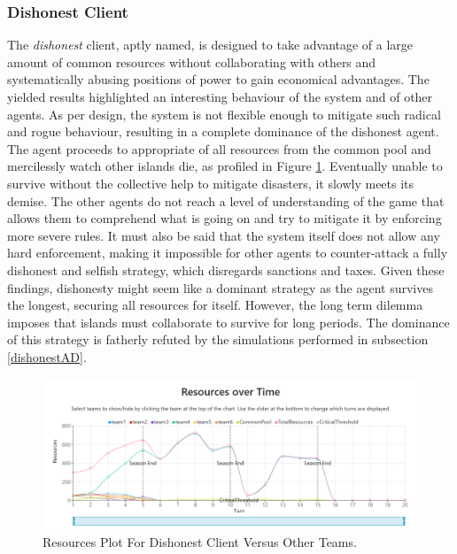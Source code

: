 \subsubsection{Dishonest Client}
The \emph{dishonest} client, aptly named, is designed to take advantage of a large amount of common resources without collaborating with others and systematically abusing positions of power to gain economical advantages. The yielded results highlighted an interesting behaviour of the system and of other agents. As per design, the system is not flexible enough to mitigate such radical and rogue behaviour, resulting in a complete dominance of the dishonest agent. The agent proceeds to appropriate of all resources from the common pool and mercilessly watch other islands die, as profiled in Figure \ref{fig:ResourcesDO}. Eventually unable to survive without the collective help to mitigate disasters, it slowly meets its demise. The other agents do not reach a level of understanding of the game that allows them to comprehend what is going on and try to mitigate it by enforcing more severe rules. It must also be said that the system itself does not allow any hard enforcement, making it impossible for other agents to counter-attack a fully dishonest and selfish strategy, which disregards sanctions and taxes. Given these findings, dishonesty might seem like a dominant strategy as the agent survives the longest, securing all resources for itself. However, the long term dilemma imposes that islands must collaborate to survive for long periods. The dominance of this strategy is fatherly refuted by the simulations performed in subsection \ref{dishonestAD}.

\begin{figure}[H]
\centering
\includegraphics[scale=0.4]{12_team4_agentdesign/images/ResourcesDO.png}
\caption{Resources Plot For Dishonest Client Versus Other Teams.}
\label{fig:ResourcesDO}
\end{figure}

